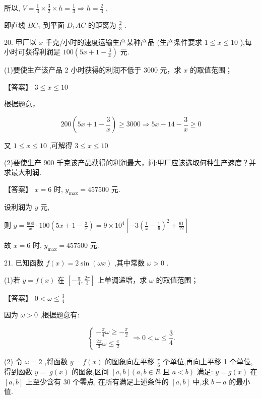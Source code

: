 \documentclass[10pt]{article}
\begin{document}
所以, \(V = \frac{1}{3} \times  \frac{3}{2} \times  h = \frac{1}{3} \Rightarrow  h = \frac{2}{3}\) ,

即直线 \(B{C}_{1}\) 到平面 \({D}_{1}{AC}\) 的距离为 \(\frac{2}{3}\) .

20. 甲厂以 \(x\) 千克/小时的速度运输生产某种产品 (生产条件要求 \(1 \leq  x \leq  {10}\) ),每小时可获得利润是 \({100}\left( {{5x} + 1 - \frac{3}{x}}\right)\) 元.

(1)要使生产该产品 2 小时获得的利润不低于 3000 元，求 \(x\) 的取值范围；

【答案】 \(3 \leq  x \leq  {10}\)

根据题意，

\[
{200}\left( {{5x} + 1 - \frac{3}{x}}\right)  \geq  {3000} \Rightarrow  {5x} - {14} - \frac{3}{x} \geq  0
\]

又 \(1 \leq  x \leq  {10}\) ,可解得 \(3 \leq  x \leq  {10}\)

(2)要使生产 900 千克该产品获得的利润最大，问:甲厂应该选取何种生产速度？并求最大利润.

【答案】 \(x = 6\) 时, \({y}_{\max } = {457500}\) 元.

设利润为 \(y\) 元,

则 \(y = \frac{900}{x} \cdot  {100}\left( {{5x} + 1 - \frac{3}{x}}\right)  = 9 \times  {10}^{4}\left\lbrack  {-3{\left( \frac{1}{x} - \frac{1}{6}\right) }^{2} + \frac{61}{12}}\right\rbrack\)

故 \(x = 6\) 时, \({y}_{\max } = {457500}\) 元.

21. 已知函数 \(f\left( x\right)  = 2\sin \left( {\omega x}\right)\) ,其中常数 \(\omega  > 0\) .

(1)若 \(y = f\left( x\right)\) 在 \(\left\lbrack  {-\frac{\pi }{4},\frac{2\pi }{3}}\right\rbrack\) 上单调递增，求 \(\omega\) 的取值范围；

【答案】 \(0 < \omega  \leq  \frac{3}{4}\)

因为 \(\omega  > 0\) ,根据题意有:

\[
\left\{  {\begin{array}{l}  - \frac{\pi }{4}\omega  \geq   - \frac{\pi }{2} \\  \frac{2\pi }{3}\omega  \leq  \frac{\pi }{2} \end{array} \Rightarrow  0 < \omega  \leq  \frac{3}{4}.}\right.
\]

(2) 令 \(\omega  = 2\) ,将函数 \(y = f\left( x\right)\) 的图象向左平移 \(\frac{\pi }{6}\) 个单位,再向上平移 1 个单位,得到函数 \(y = \; g\left( x\right)\) 的图象,区间 \(\left\lbrack  {a,b}\right\rbrack  \left( {a,b \in  R\text{ 且 }a < b}\right)\) 满足: \(y = g\left( x\right)\) 在 \(\left\lbrack  {a,b}\right\rbrack\) 上至少含有 30 个零点, 在所有满足上述条件的 \(\left\lbrack  {a,b}\right\rbrack\) 中,求 \(b - a\) 的最小值.
\end{document}
